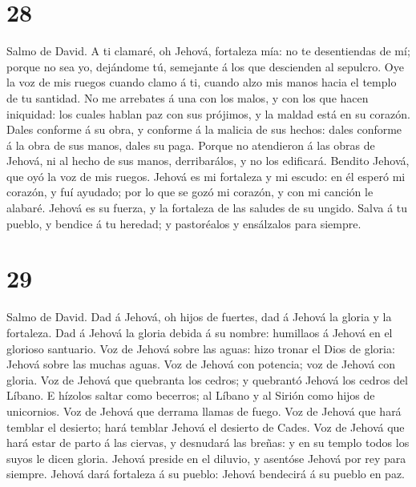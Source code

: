 \hypertarget{section-27}{%
\section{28}\label{section-27}}

 Salmo de David. A ti clamaré, oh Jehová, fortaleza mía:
no te desentiendas de mí; porque no sea yo, dejándome tú, semejante á
los que descienden al sepulcro.  Oye la voz de mis ruegos
cuando clamo á ti, cuando alzo mis manos hacia el templo de tu santidad.
 No me arrebates á una con los malos, y con los que hacen
iniquidad: los cuales hablan paz con sus prójimos, y la maldad está en
su corazón.  Dales conforme á su obra, y conforme á la
malicia de sus hechos: dales conforme á la obra de sus manos, dales su
paga.  Porque no atendieron á las obras de Jehová, ni al
hecho de sus manos, derribarálos, y no los edificará. 
Bendito Jehová, que oyó la voz de mis ruegos.  Jehová es
mi fortaleza y mi escudo: en él esperó mi corazón, y fuí ayudado; por lo
que se gozó mi corazón, y con mi canción le alabaré. 
Jehová es su fuerza, y la fortaleza de las saludes de su ungido.
 Salva á tu pueblo, y bendice á tu heredad; y pastoréalos
y ensálzalos para siempre.

\hypertarget{section-28}{%
\section{29}\label{section-28}}

 Salmo de David. Dad á Jehová, oh hijos de fuertes, dad á
Jehová la gloria y la fortaleza.  Dad á Jehová la gloria
debida á su nombre: humillaos á Jehová en el glorioso santuario.
 Voz de Jehová sobre las aguas: hizo tronar el Dios de
gloria: Jehová sobre las muchas aguas.  Voz de Jehová con
potencia; voz de Jehová con gloria.  Voz de Jehová que
quebranta los cedros; y quebrantó Jehová los cedros del Líbano.
 E hízolos saltar como becerros; al Líbano y al Sirión
como hijos de unicornios.  Voz de Jehová que derrama
llamas de fuego.  Voz de Jehová que hará temblar el
desierto; hará temblar Jehová el desierto de Cades.  Voz
de Jehová que hará estar de parto á las ciervas, y desnudará las breñas:
y en su templo todos los suyos le dicen gloria.  Jehová
preside en el diluvio, y asentóse Jehová por rey para siempre.
 Jehová dará fortaleza á su pueblo: Jehová bendecirá á su
pueblo en paz.

